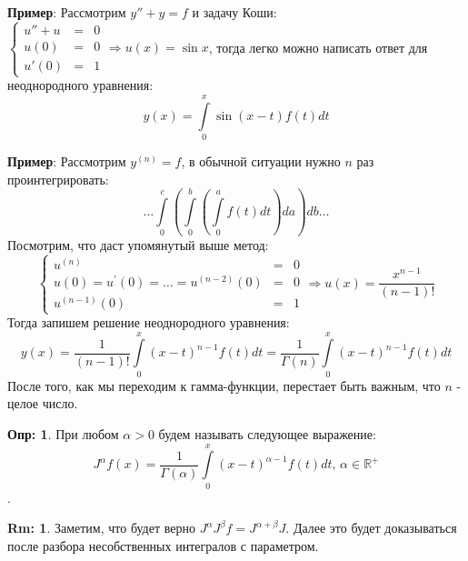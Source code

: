 \documentclass[12pt]{article}
\newcommand{\MR}{\mathbb{R}}
\theoremstyle{definition}
\newtheorem{defn}{Опр:}
\newtheorem{rem}{Rm:}
\newcommand{\ddint}[2]{\displaystyle\int\limits_{#1}^{#2}}
\begin{document}
\textbf{Пример}: Рассмотрим $y'' + y = f$ и задачу Коши: $
	\left\{
	\begin{array}{lll}
		u'' + u & = & 0 \\[4pt]
		u(0)  &=& 0 \\[4pt]
		u'(0) &=& 1 
	\end{array}\right. \Rightarrow u(x) = \sin{x}
$, тогда легко можно написать ответ для неоднородного уравнения:
$$
	y(x) = \ddint{0}{x}\sin{(x - t)}f(t)dt
$$

\textbf{Пример}: Рассмотрим $y^{(n)} = f$, в обычной ситуации нужно $n$ раз проинтегрировать:
$$
	\dotsc \ddint{0}{c}\left(\ddint{0}{b}\left(\ddint{0}{a}f(t)dt\right)da\right)db \dotsc
$$
Посмотрим, что даст упомянутый выше метод:
$$
\left\{
	\begin{array}{lll}
		u^{(n)}  & = & 0 \\[4pt]
		u(0) = u^\prime(0) = \dotsc = u^{(n-2)}(0) &=& 0 \\[4pt]
		u^{(n-1)}(0) &=& 1 
	\end{array}\right. \Rightarrow u(x) = \dfrac{x^{n-1}}{(n-1)!}
$$
Тогда запишем решение неоднородного уравнения:
$$
	y(x) = \dfrac{1}{(n-1)!}\ddint{0}{x}(x - t)^{n-1}f(t)dt = \dfrac{1}{\Gamma (n)}\ddint{0}{x}(x-t)^{n-1}f(t)dt
$$
После того, как мы переходим к гамма-функции, перестает быть важным, что $n$ - целое число.
\begin{defn}
	При любом $\alpha > 0$ будем называть следующее выражение:
	$$
		J^\alpha f(x) = \dfrac{1}{\Gamma (\alpha)}\ddint{0}{x}(x-t)^{\alpha - 1}f(t)dt, \, \alpha \in \MR^{+}
	$$ 
	.
\end{defn}

\begin{rem}
	Заметим, что будет верно $J^{\alpha}J^{\beta}f = J^{\alpha + \beta} J$. Далее это будет доказываться после разбора несобственных интегралов с параметром.
\end{rem}
\end{document}
